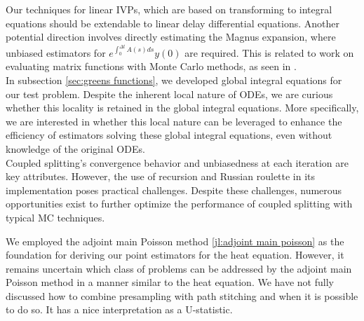 \documentclass[a4paper,12pt]{article}
\begin{document}
Our techniques for linear IVPs, which are based on transforming to integral equations should be extendable
to linear delay differential equations. Another potential direction involves directly estimating
the Magnus expansion, where unbiased estimators for $e^{\int_{0}^{\Delta t} A(s)ds} y(0)$ are required.
This is related to work on evaluating matrix functions with Monte Carlo methods, as seen in \cite{guidotti_fast_2023}. \\

In subsection \ref{sec:greens functions}, we developed global integral equations for our test problem.
Despite the inherent local nature of ODEs, we are curious whether this locality is retained in the global integral equations.
More specifically, we are interested in whether this local nature can be leveraged to enhance the efficiency of
estimators solving these global integral equations, even without knowledge of the original ODEs.  \\

Coupled splitting's convergence behavior and unbiasedness at each iteration are key attributes.
However, the use of recursion and Russian roulette in its implementation poses practical challenges.
Despite these challenges, numerous opportunities exist to further optimize the performance of coupled splitting
with typical MC techniques.

We employed the adjoint main Poisson method \ref{jl:adjoint main poisson} as the foundation for deriving our
point estimators for the heat equation. However, it remains uncertain which class of problems can be addressed
by the adjoint main Poisson method in a manner similar to the heat equation.
We have not fully discussed how to combine presampling with path stitching and when it is possible to do so.
It has a nice interpretation as a U-statistic. \\



\end{document}
